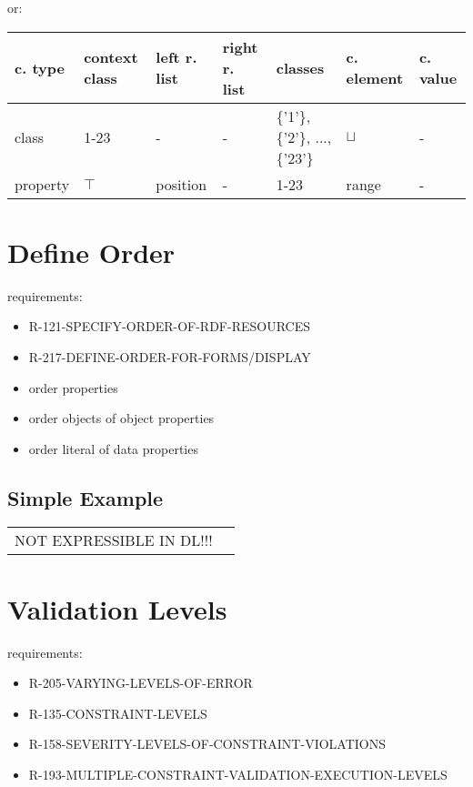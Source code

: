 \documentclass{llncs}
\newenvironment{gcotable}{
  \scriptsize
  \sffamily
  \vspace{0.3cm}
	\begin{center}
  \begin{tabular}{l|l|l|l|l|l|l}
  \hline
  \textbf{c. type} & \textbf{context class} & \textbf{left r. list} & \textbf{right r. list} & \textbf{classes} & \textbf{c. element} & \textbf{c. value} \\
  \hline

}{
  \hline
  \end{tabular}
	\end{center}
}
\newenvironment{DL}{
	\begin{center}
  \begin{tabular}{r l}

}{
  \end{tabular}
	\end{center}
}
\begin{document}
or:

\begin{gcotable}
class & 1-23 & - & - & \{'1'\}, \{'2'\}, ..., \{'23'\} & $\sqcup$ & - \\
property & $\top$ & position & - & 1-23 & range& - \\
\end{gcotable}

\section{Define Order}

requirements:

\begin{itemize}
  \item R-121-SPECIFY-ORDER-OF-RDF-RESOURCES
	\item R-217-DEFINE-ORDER-FOR-FORMS/DISPLAY
\end{itemize}



\begin{itemize}
	\item order properties
	\item order objects of object properties
	\item order literal of data properties
\end{itemize}

\subsection{Simple Example}

\begin{DL}
NOT EXPRESSIBLE IN DL!!!
\end{DL}

\section{Validation Levels}

requirements:

\begin{itemize}
	\item R-205-VARYING-LEVELS-OF-ERROR
	\item R-135-CONSTRAINT-LEVELS
	\item R-158-SEVERITY-LEVELS-OF-CONSTRAINT-VIOLATIONS
	\item R-193-MULTIPLE-CONSTRAINT-VALIDATION-EXECUTION-LEVELS
\end{itemize}
\end{document}
